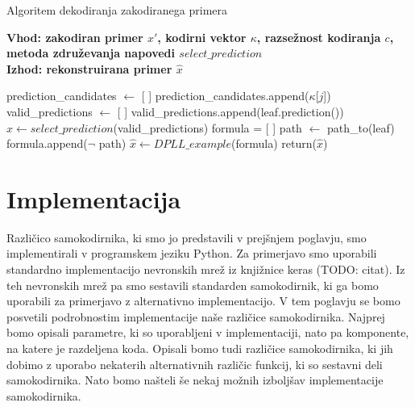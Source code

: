 \documentclass[12pt,a4paper,twoside]{article}
\theoremstyle{definition} %
\theoremstyle{plain} %
\numberwithin{equation}{section}  %
\begin{document}
\begin{algorithm}[h!]
	\caption{Algoritem dekodiranja zakodiranega primera}
	\label{algoritem-decode}
	\raggedright
	\textbf{Vhod: zakodiran primer $x'$, kodirni vektor $\kappa$, razsežnost kodiranja $c$, metoda združevanja napovedi $select\_prediction$}  \\
	\textbf{Izhod: rekonstruirana primer $\hat{x}$} 
	\begin{algorithmic}[0]
			\State prediction\_candidates $\gets$ [ ]
				\State prediction\_candidates.append($\kappa$[$j$])
			\EndIf
		\EndFor
			\State valid\_predictions $\gets$ [ ]
				\State valid\_predictions.append(leaf.prediction())
			\EndFor
			\State $\hat{x} \gets select\_prediction$(valid\_predictions) 
		\Else
			\State formula = [ ]
				\State path $\gets$ path\_to(leaf)
				\State formula.append($\lnot$ path)
			\EndFor
			\State $\hat{x} \gets DPLL\_example$(formula)
		\EndIf
		\State return($\hat{x}$)
	\end{algorithmic}
\end{algorithm}



\section{Implementacija}

Različico samokodirnika, ki smo jo predstavili v prejšnjem poglavju, smo implementirali v programskem jeziku Python.
Za primerjavo smo uporabili standardno implementacijo nevronskih mrež iz knjižnice keras (TODO: citat). %
Iz teh nevronskih mrež pa smo sestavili standarden samokodirnik, ki ga bomo uporabili za primerjavo z alternativno implementacijo.
V tem poglavju se bomo posvetili podrobnostim implementacije naše različice samokodirnika.
Najprej bomo opisali parametre, ki so uporabljeni v implementaciji, nato pa komponente, na katere je razdeljena koda.
Opisali bomo tudi različice samokodirnika, ki jih dobimo z uporabo nekaterih alternativnih različic funkcij, ki so sestavni deli samokodirnika.
Nato bomo našteli še nekaj možnih izboljšav implementacije samokodirnika.
\end{document}
